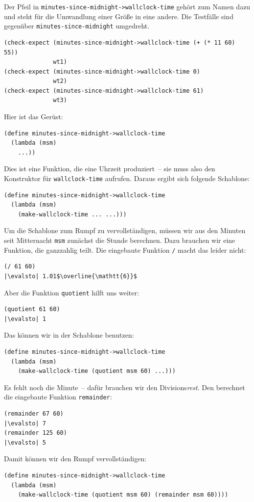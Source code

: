 %
Der Pfeil in \lstinline{minutes-since-midnight->wallclock-time} gehört zum Namen dazu und steht für die Umwandlung
einer Größe in eine andere.  Die Testfälle sind gegenüber
\lstinline{minutes-since-midnight} umgedreht.
%
\begin{lstlisting}
(check-expect (minutes-since-midnight->wallclock-time (+ (* 11 60) 55))
              wt1)
(check-expect (minutes-since-midnight->wallclock-time 0)
              wt2)
(check-expect (minutes-since-midnight->wallclock-time 61)
              wt3)
\end{lstlisting}
%
Hier ist das Gerüst:
%
\begin{lstlisting}
(define minutes-since-midnight->wallclock-time
  (lambda (msm)
    ...))
\end{lstlisting}
%
Dies ist eine Funktion, die eine Uhrzeit produziert~-- sie muss also
den Konstruktor für \lstinline{wallclock-time} aufrufen.  Daraus ergibt
sich folgende Schablone:
%
\begin{lstlisting}
(define minutes-since-midnight->wallclock-time
  (lambda (msm)
    (make-wallclock-time ... ...)))
\end{lstlisting}
% 
Um die Schablone zum Rumpf zu vervollständigen, müssen wir aus den
Minuten seit Mitternacht \lstinline{msm} zunächst die Stunde berechnen.
Dazu brauchen wir eine Funktion, die ganzzahlig teilt.  Die eingebaute
Funktion \lstinline{/} macht das leider nicht:
%
\begin{lstlisting}
(/ 61 60)
|\evalsto| 1.01$\overline{\mathtt{6}}$
\end{lstlisting}
%
Aber die Funktion \lstinline{quotient} hilft uns weiter:\label{func:quotient}
%
\begin{lstlisting}
(quotient 61 60)
|\evalsto| 1
\end{lstlisting}
%
Das können wir in der Schablone benutzen:
%
\begin{lstlisting}
(define minutes-since-midnight->wallclock-time
  (lambda (msm)
    (make-wallclock-time (quotient msm 60) ...)))
\end{lstlisting}
%
Es fehlt noch die Minute~-- dafür brauchen wir den
Divisions\emph{rest}.  Den berechnet die eingebaute Funktion
\lstinline{remainder}:
%
\begin{lstlisting}
(remainder 67 60)
|\evalsto| 7
(remainder 125 60)
|\evalsto| 5
\end{lstlisting}
%
Damit können wir den Rumpf vervollständigen:
%
\begin{lstlisting}
(define minutes-since-midnight->wallclock-time
  (lambda (msm)
    (make-wallclock-time (quotient msm 60) (remainder msm 60))))
\end{lstlisting}

